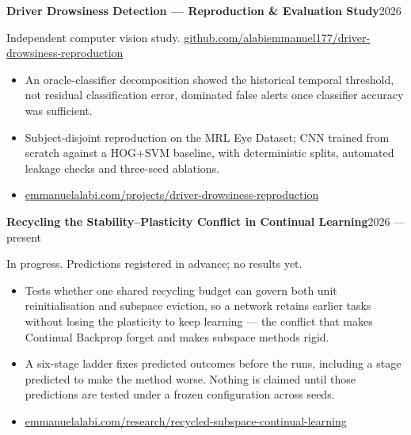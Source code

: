 \documentclass[10pt,a4paper]{article}
\newcommand{\cventry}[2]{%
  \textbf{#1}\hfill{\small #2}\par\vspace{0.15em}%
}
\newenvironment{cvitems}{%
  \begin{itemize}%
    \setlength{\itemsep}{0.12em}%
    \setlength{\parskip}{0pt}%
    \setlength{\parsep}{0pt}%
    \setlength{\topsep}{0.25em}%
    \setlength{\partopsep}{0pt}%
}{%
  \end{itemize}%
  \vspace{0.25em}%
}
\begin{document}
\cventry{Driver Drowsiness Detection --- Reproduction \& Evaluation Study}{2026}
{\small Independent computer vision study.
\href{https://github.com/alabiemmanuel177/driver-drowsiness-reproduction}{github.com/alabiemmanuel177/driver-drowsiness-reproduction}}
\begin{cvitems}
  \item An oracle-classifier decomposition showed the historical temporal
        threshold, not residual classification error, dominated false alerts
        once classifier accuracy was sufficient.
  \item Subject-disjoint reproduction on the MRL Eye Dataset; CNN trained from
        scratch against a HOG+SVM baseline, with deterministic splits, automated
        leakage checks and three-seed ablations.
  \item \href{https://www.emmanuelalabi.com/projects/driver-drowsiness-reproduction}{emmanuelalabi.com/projects/driver-drowsiness-reproduction}
\end{cvitems}

\cventry{Recycling the Stability--Plasticity Conflict in Continual Learning}{2026 --- present}
{\small In progress. Predictions registered in advance; no results yet.}
\begin{cvitems}
  \item Tests whether one shared recycling budget can govern both unit
        reinitialisation and subspace eviction, so a network retains earlier
        tasks without losing the plasticity to keep learning --- the conflict
        that makes Continual Backprop forget and makes subspace methods rigid.
  \item A six-stage ladder fixes predicted outcomes before the runs, including a
        stage predicted to make the method worse. Nothing is claimed until those
        predictions are tested under a frozen configuration across seeds.
  \item \href{https://www.emmanuelalabi.com/research/recycled-subspace-continual-learning}{emmanuelalabi.com/research/recycled-subspace-continual-learning}
\end{cvitems}
\end{document}
